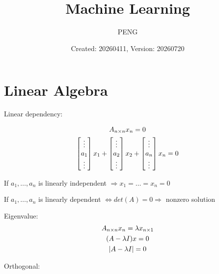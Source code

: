 \documentclass{article}
\title{Machine Learning}
\author{PENG}
\date{Created: 20260411, Version: 20260720}
\begin{document}
\maketitle
\tableofcontents
\section{Linear Algebra}
\begin{definition}
    Linear dependency:

    \begin{gather*}
        A_{n \times n} x_{n \time 1} = 0 \\
        \begin{bmatrix}\vdots \\ a_{1} \\ \vdots\end{bmatrix} x_{1}
        + \begin{bmatrix}\vdots \\ a_{2} \\ \vdots\end{bmatrix} x_{2}
        + \begin{bmatrix}\vdots \\ a_{n} \\ \vdots\end{bmatrix} x_{n} = 0
    \end{gather*}

    If $a_{1}, \dots, a_{n}$ is linearly independent $\Rightarrow x_{1} = \dots = x_{n} = 0$

    If $a_{1}, \dots, a_{n}$ is linearly dependent $\Leftrightarrow det(A) = 0 \Rightarrow$ nonzero solution
\end{definition}

\begin{definition}
    Eigenvalue:
    \begin{gather}
        A_{n \times n}x_{n \time 1} = \lambda x_{n \times 1} \label{eq:eigen-value} \\
        (A - \lambda I) x = 0 \nonumber \\
        |A - \lambda I| = 0
    \end{gather}

\end{definition}

\begin{definition}
    Orthogonal:
\end{definition}
\end{document}

